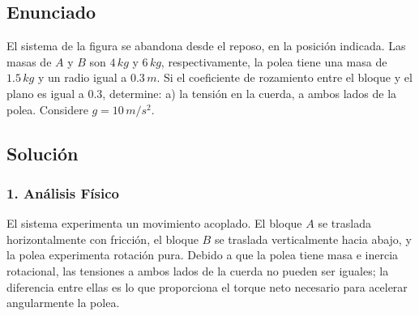\documentclass[12pt, a4paper]{article}
\begin{document}
\newpage

\subsection*{Enunciado}
El sistema de la figura se abandona desde el reposo, en la posición indicada. Las masas de $A$ y $B$ son $4 \, \si{kg}$ y $6 \, \si{kg}$, respectivamente, la polea tiene una masa de $1.5 \, \si{kg}$ y un radio igual a $0.3 \, \si{m}$. Si el coeficiente de rozamiento entre el bloque y el plano es igual a $0.3$, determine:
a) la tensión en la cuerda, a ambos lados de la polea.
Considere $g = 10 \, \si{m/s^2}$.

\begin{center}
\end{center}

\subsection*{Solución}

\subsubsection*{1. Análisis Físico}
El sistema experimenta un movimiento acoplado. El bloque $A$ se traslada horizontalmente con fricción, el bloque $B$ se traslada verticalmente hacia abajo, y la polea experimenta rotación pura. Debido a que la polea tiene masa e inercia rotacional, las tensiones a ambos lados de la cuerda no pueden ser iguales; la diferencia entre ellas es lo que proporciona el torque neto necesario para acelerar angularmente la polea.
\end{document}
